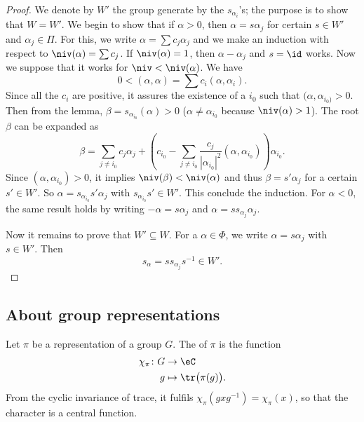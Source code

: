 \begin{proof}
	We denote by $W'$ the group generate by the $s_{\alpha_i}$'s; the purpose is to show that $W=W'$. We begin to show that if $\alpha>0$, then $\alpha=s\alpha_j$ for certain $s\in W'$ and $\alpha_j\in\Pi$. For this, we write $\alpha=\sum c_j\alpha_j$ and we make an induction with respect to $\niv(\alpha)=\sum c_j$. If $\niv(\alpha)=1$, then $\alpha-\alpha_j$ and $s=\id$ works.  Now we suppose that it works for $\niv<\niv(\alpha)$. We have
	\[
		0<(\alpha,\alpha)=\sum c_i(\alpha,\alpha_i).
	\]
	Since all the $c_i$ are positive, it assures the existence of a $i_0$ such that $(\alpha,\alpha_{i_0)}>0$. Then from the lemma, $\beta=s_{\alpha_{i_0}}(\alpha)>0$ ($\alpha\neq \alpha_{i_0}$ because $\niv(\alpha)>1$). The root $\beta$ can be expanded as
	\begin{equation}
		\beta=\sum_{j \neq i_0}c_j\alpha_j+\left(  c_{i_0}-\sum_{j\neq i_0}\frac{c_j}{|\alpha_{i_0}|^2}(\alpha,\alpha_{i_0})   \right)\alpha_{i_0}.
	\end{equation}
	Since $(\alpha,\alpha_{i_0})>0$, it implies $\niv(\beta)<\niv(\alpha)$ and thus $\beta=s'\alpha_j$ for a certain $s'\in W'$. So $\alpha=s_{\alpha_{i_0}}s'\alpha_j$ with $s_{\alpha_{i_0}}s'\in W'$. This conclude the induction. For $\alpha<0$, the same result holds by writing $-\alpha=s\alpha_j$ and $\alpha=ss_{\alpha_j}\alpha_j$.

	Now it remains to prove that $W'\subseteq W$. For a $\alpha\in\Phi$, we write $\alpha=s\alpha_j$ with $s\in W'$. Then
	\[
		s_{\alpha}=ss_{\alpha_j}s^{-1}\in W'.
	\]
\end{proof}

\subsection{About group representations}

Let $\pi$ be a representation of a group $G$. The  of $\pi$ is the function
\begin{equation}
	\begin{aligned}
		\chi_{\pi}\colon G & \to\eC                         \\
		g                  & \mapsto \tr\big( \pi(g) \big).
	\end{aligned}
\end{equation}
From the cyclic invariance of trace, it fulfils $\chi_{\pi}(gxg^{-1})=\chi_{\pi}(x)$, so that the character is a central function.

